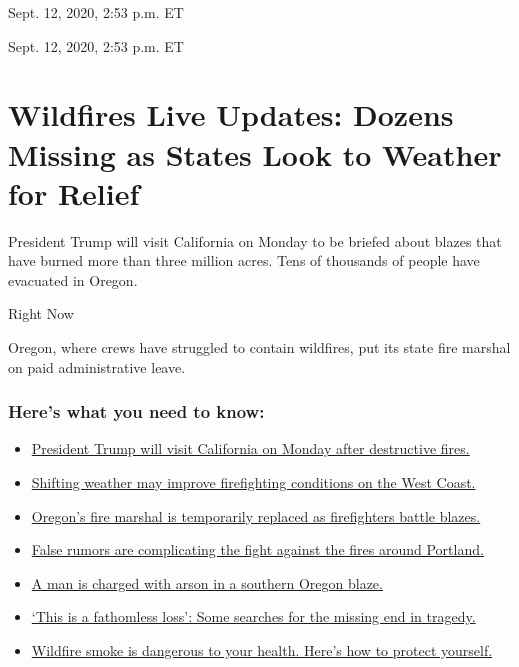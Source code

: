 Sept. 12, 2020, 2:53 p.m. ET

Sept. 12, 2020, 2:53 p.m. ET

\hypertarget{wildfires-live-updates-dozens-missing-as-states-look-to-weather-for-relief}{%
\section{Wildfires Live Updates: Dozens Missing as States Look to
Weather for
Relief}\label{wildfires-live-updates-dozens-missing-as-states-look-to-weather-for-relief}}

President Trump will visit California on Monday to be briefed about
blazes that have burned more than three million acres. Tens of thousands
of people have evacuated in Oregon.

Right Now

Oregon, where crews have struggled to contain wildfires, put its state
fire marshal on paid administrative leave.

\hypertarget{heres-what-you-need-to-know}{%
\subsubsection{Here's what you need to
know:}\label{heres-what-you-need-to-know}}

\begin{itemize}
\tightlist
\item
  \protect\hyperlink{link-f3961ff}{President Trump will visit California
  on Monday after destructive fires.}
\item
  \protect\hyperlink{link-7e503ae9}{Shifting weather may improve
  firefighting conditions on the West Coast.}
\item
  \protect\hyperlink{link-5e4c548d}{Oregon's fire marshal is temporarily
  replaced as firefighters battle blazes.}
\item
  \protect\hyperlink{link-7a0c7fbe}{False rumors are complicating the
  fight against the fires around Portland.}
\item
  \protect\hyperlink{link-18416023}{A man is charged with arson in a
  southern Oregon blaze.}
\item
  \protect\hyperlink{link-5b86b2c4}{`This is a fathomless loss': Some
  searches for the missing end in tragedy.}
\item
  \protect\hyperlink{link-7a6a9ef4}{Wildfire smoke is dangerous to your
  health. Here's how to protect yourself.}
\end{itemize}

